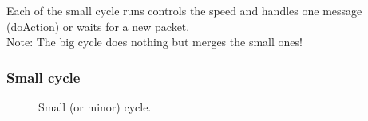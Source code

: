 Each of the small cycle runs controls the speed and handles one message (doAction) or waits for a new packet.\\
Note: The big cycle does nothing but merges the small ones!

\subsubsection{Small cycle}

\begin{figure}[ht] 
	\caption{Small (or minor) cycle.} \label{small}
\end{figure}

